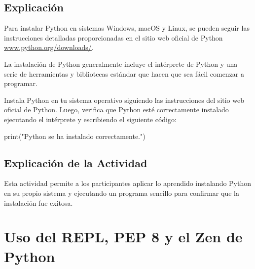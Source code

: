 \documentclass[
  a4paper,
  DIV=11,
  numbers=noendperiod,
  onepage,
  openany]{scrreprt}
\newenvironment{Shaded}{\begin{snugshade}}{\end{snugshade}}
\newcommand{\BuiltInTok}[1]{\textcolor[rgb]{0.00,0.23,0.31}{#1}}
\newcommand{\NormalTok}[1]{\textcolor[rgb]{0.00,0.23,0.31}{#1}}
\newcommand{\StringTok}[1]{\textcolor[rgb]{0.13,0.47,0.30}{#1}}
\begin{document}
\section{Explicación}\label{explicaciuxf3n-1}

Para instalar Python en sistemas Windows, macOS y Linux, se pueden
seguir las instrucciones detalladas proporcionadas en el sitio web
oficial de Python
\href{https://www.python.org/downloads/}{www.python.org/downloads/}.

La instalación de Python generalmente incluye el intérprete de Python y
una serie de herramientas y bibliotecas estándar que hacen que sea fácil
comenzar a programar.

\begin{tcolorbox}[enhanced jigsaw, leftrule=.75mm, bottomtitle=1mm, title=\textcolor{quarto-callout-tip-color}{\faLightbulb}\hspace{0.5em}{Actividad Práctica}, colbacktitle=quarto-callout-tip-color!10!white, coltitle=black, bottomrule=.15mm, colframe=quarto-callout-tip-color-frame, titlerule=0mm, opacityback=0, rightrule=.15mm, toptitle=1mm, opacitybacktitle=0.6, arc=.35mm, breakable, colback=white, toprule=.15mm, left=2mm]

Instala Python en tu sistema operativo siguiendo las instrucciones del
sitio web oficial de Python. Luego, verifica que Python esté
correctamente instalado ejecutando el intérprete y escribiendo el
siguiente código:

\begin{Shaded}
\begin{Highlighting}[]
\BuiltInTok{print}\NormalTok{(}\StringTok{"Python se ha instalado correctamente."}\NormalTok{)}
\end{Highlighting}
\end{Shaded}

\end{tcolorbox}

\section{Explicación de la
Actividad}\label{explicaciuxf3n-de-la-actividad-1}

Esta actividad permite a los participantes aplicar lo aprendido
instalando Python en su propio sistema y ejecutando un programa sencillo
para confirmar que la instalación fue exitosa.

\chapter{Uso del REPL, PEP 8 y el Zen de
Python}\label{uso-del-repl-pep-8-y-el-zen-de-python}
\end{document}
